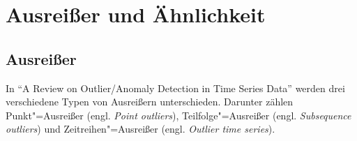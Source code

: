 \section{Ausreißer und Ähnlichkeit}
\subsection{Ausreißer}
In "`A Review on Outlier/Anomaly Detection in Time Series Data"' \cite{aauj2021} werden drei verschiedene Typen von Ausreißern unterschieden. Darunter zählen Punkt"=Ausreißer (engl. \textit{Point outliers}), Teilfolge"=Ausreißer (engl. \textit{Subsequence outliers}) und Zeitreihen"=Ausreißer (engl. \textit{Outlier time series}).